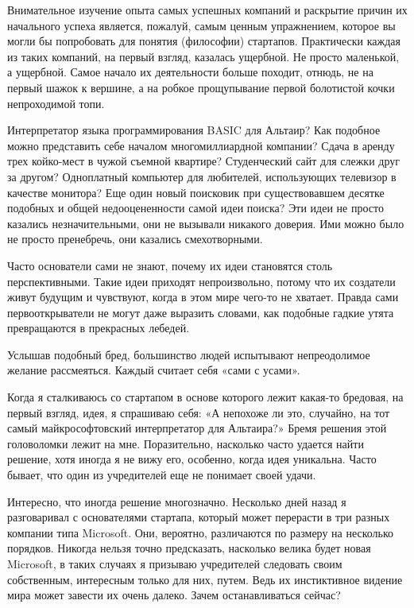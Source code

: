 \documentclass[ebook,12pt,oneside,openany]{memoir}
\author{Пол Грэм} \date{}
\begin{document}
\maketitle

Внимательное изучение опыта самых успешных компаний и раскрытие причин
их начального успеха является, пожалуй, самым ценным упражнением,
которое вы могли бы попробовать для понятия (философии) стартапов.
Практически каждая из таких компаний, на первый взгляд, казалась
ущербной. Не просто маленькой, а ущербной. Самое начало их
деятельности больше походит, отнюдь, не на первый шажок к вершине, а
на робкое прощупывание первой болотистой кочки непроходимой топи.

Интерпретатор языка программирования BASIC для Альтаир? Как подобное
можно представить себе началом многомиллиардной компании? Сдача в
аренду трех койко-мест в чужой съемной квартире? Студенческий сайт для
слежки друг за другом? Одноплатный компьютер для любителей,
использующих телевизор в качестве монитора? Еще один новый поисковик
при существовавшем десятке подобных и общей недооцененности самой идеи
поиска? Эти идеи не просто казались незначительными, они не вызывали
никакого доверия. Ими можно было не просто пренебречь, они казались
смехотворными.

Часто основатели сами не знают, почему их идеи становятся столь
перспективными. Такие идеи приходят непроизвольно, потому что их
создатели живут будущим и чувствуют, когда в этом мире чего-то не
хватает. Правда сами первооткрыватели не могут даже выразить словами,
как подобные гадкие утята превращаются в прекрасных лебедей.

Услышав подобный бред, большинство людей испытывают непреодолимое
желание рассмеяться. Каждый считает себя «сами с усами».

Когда я сталкиваюсь со стартапом в основе которого лежит какая-то
бредовая, на первый взгляд, идея, я спрашиваю себя: «А непохоже ли
это, случайно, на тот самый майкрософтовский интерпретатор для
Альтаира?» Бремя решения этой головоломки лежит на мне. Поразительно,
насколько часто удается найти решение, хотя иногда я не вижу его,
особенно, когда идея уникальна. Часто бывает, что один из учредителей
еще не понимает своей удачи.

Интересно, что иногда решение многозначно. Несколько дней назад я
разговаривал с основателями стартапа, который может перерасти в три
разных компании типа Microsoft. Они, вероятно, различаются по размеру
на несколько порядков. Никогда нельзя точно предсказать, насколько
велика будет новая Microsoft, в таких случаях я призываю учредителей
следовать своим собственным, интересным только для них, путем. Ведь их
инстиктивное видение мира может завести их очень далеко. Зачем
останавливаться сейчас?
\end{document}
